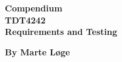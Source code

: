 \begin{titlepage}
\begin{center}

{\Huge \bf Compendium} \\[1.0cm]
{\Huge \bf TDT4242} \\[1.0cm]
{\Large \bf Requirements and Testing} \\[1.0cm]
\vspace{1cm}

{\bf By Marte Løge}


\end{center}
\end{titlepage}